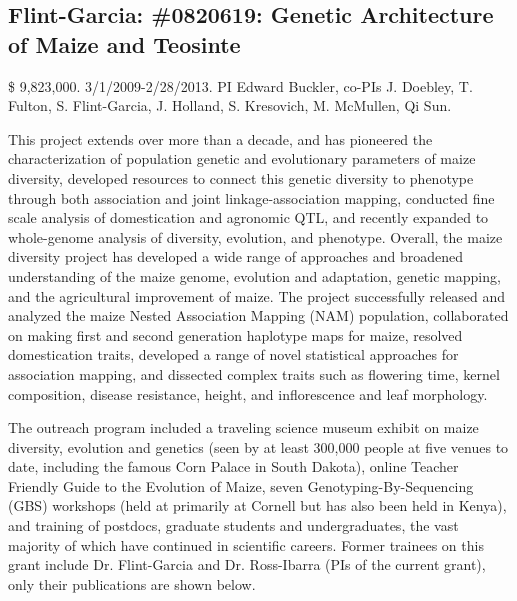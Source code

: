 \subsection*{Flint-Garcia: \#0820619: Genetic Architecture of Maize and Teosinte}
\$ 9,823,000. 3/1/2009-2/28/2013. PI Edward Buckler, co-PIs J. Doebley, T. Fulton, S. Flint-Garcia, J. Holland, S. Kresovich, M. McMullen, Qi Sun. 
\par{}  This project extends over more than a decade, and has pioneered the characterization of population genetic and evolutionary parameters of maize diversity, developed resources to connect this genetic diversity to phenotype through both association and joint linkage-association mapping, conducted fine scale analysis of domestication and agronomic QTL, and recently expanded to whole-genome analysis of diversity, evolution, and phenotype. Overall, the maize diversity project has developed a wide range of approaches and broadened understanding of the maize genome, evolution and adaptation, genetic mapping, and the agricultural improvement of maize. The project successfully released and analyzed the maize Nested Association Mapping (NAM) population, collaborated on making first and second generation haplotype maps for maize, resolved domestication traits, developed a range of novel statistical approaches for association mapping, and dissected complex traits such as flowering time, kernel composition, disease resistance, height, and inflorescence and leaf morphology. 
\par{} The outreach program included a traveling science museum exhibit on maize diversity, evolution and genetics (seen by at least 300,000 people at five venues to date, including the famous Corn Palace in South Dakota), online Teacher Friendly Guide to the Evolution of Maize, seven Genotyping-By-Sequencing (GBS) workshops (held at primarily at Cornell but has also been held in Kenya), and training of postdocs, graduate students and undergraduates, the vast majority of which have continued in scientific careers.  Former trainees on this grant include Dr. Flint-Garcia  and Dr. Ross-Ibarra  (PIs of the current grant), only their publications are shown below.
\par{} \citet{Buckler2009, Flint-Garcia2009, Flint-Garcia2009a, Flint-Garcia2009b, Gore2009, McMullen2009, Ross-Ibarra2009a, Bottoms2010, Dubois2010, Zhang2010a, vanheerwaarden2010a, vanheerwaarden2010b, Brown2011b, Morrell2011a, Studer2011b, vanheerwaarden2011a, Tian2011, Chia2012a, Cook2012a, Fang2012a, Hufford2012b, Hung2012, Hung2012a, Romay2013}
